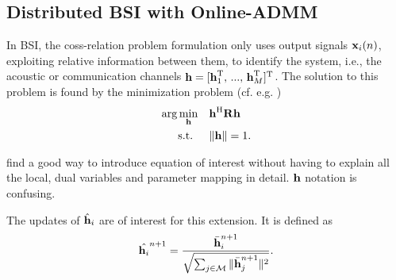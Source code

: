 \documentclass{article}
\begin{document}
\subsection[]{Distributed BSI with Online-ADMM}
In BSI, the coss-relation problem formulation only uses output signals \(\bm{\mathrm{x}}_i(n)\), exploiting relative information between them, to identify the system, i.e., the acoustic or communication channels \(\bm{\mathrm{h}} = [\bm{\mathrm{h}}_1^{\mathrm{T}},\,...,\,\bm{\mathrm{h}}_M^{\mathrm{T}}]^{\mathrm{T}}\).
The solution to this problem is found by the minimization problem (cf. e.g. \cite{langtongBlindIdentificationEqualization1994,huangAdaptiveMultichannelLeast2002,huangClassFrequencydomainAdaptive2003,blochbergerDBSI})
\begin{equation}
    \begin{aligned}
        \arg \min_{\bm{\mathrm{h}}} \quad &\bm{\mathrm{h}}^{\mathrm{H}} \bm{\mathrm{R}} \bm{\mathrm{h}} \\
        \text{s.t. } \quad &\|\bm{\mathrm{h}}\| = 1.
    \end{aligned}\label{eq:frequency_domain:min_prob}
\end{equation}
\begin{todo}
    find a good way to introduce equation of interest without having to explain all the local, dual variables and parameter mapping in detail.
    \(\bm{\mathrm{h}}\) notation is confusing.
\end{todo}
The updates of \(\hat{\bm{\mathrm{h}}}_i\) are of interest for this extension.
It is defined \cite{blochbergerDBSI} as
\begin{equation}
    \hat{\bm{\mathrm{h}}_i}^{n+1} = \frac{\bar{\bm{\mathrm{h}}}_i^{n+1}}{\sqrt{\sum_{j \in \mathcal{M}} \|\bar{\bm{\mathrm{h}}}_j^{n+1}\|^2}}.\label{eq:online_admm:consensus_update}
\end{equation}
\end{document}

